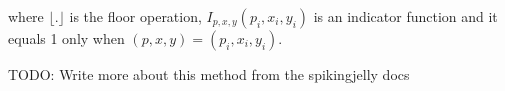 where $ \lfloor . \rfloor $ is the floor operation, $ I_{p, x, y}(p_i, x_i, y_i) $ is an indicator function and it equals 1 only when $ (p, x, y) = (p_i, x_i, y_i) $.

\color{red} TODO: Write more about this method from the spikingjelly docs \color{black}







